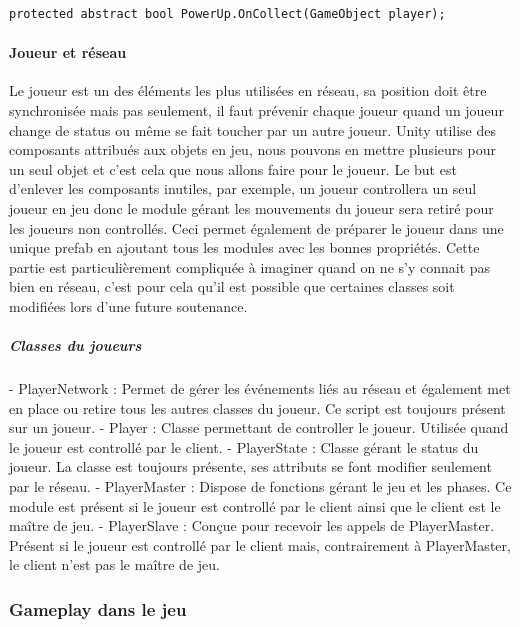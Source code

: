 \documentclass{article}
\begin{document}
\begin{lstlisting}
protected abstract bool PowerUp.OnCollect(GameObject player);
\end{lstlisting}

\paragraph{Joueur et réseau}

Le joueur est un des éléments les plus utilisées en réseau, sa position doit être synchronisée mais pas seulement, il faut prévenir chaque joueur quand un joueur change de status ou même se fait toucher par un autre joueur. Unity utilise des composants attribués aux objets en jeu, nous pouvons en mettre plusieurs pour un seul objet et c'est cela que nous allons faire pour le joueur. Le but est d'enlever les composants inutiles, par exemple, un joueur controllera un seul joueur en jeu donc le module gérant les mouvements du joueur sera retiré pour les joueurs non controllés. Ceci permet également de préparer le joueur dans une unique prefab en ajoutant tous les modules avec les bonnes propriétés.
Cette partie est particulièrement compliquée à imaginer quand on ne s'y connait pas bien en réseau, c'est pour cela qu'il est possible que certaines classes soit modifiées lors d'une future soutenance.

\subparagraph{Classes du joueurs}


- PlayerNetwork : Permet de gérer les événements liés au réseau et également met en place ou retire tous les autres classes du joueur. Ce script est toujours présent sur un joueur.
- Player : Classe permettant de controller le joueur. Utilisée quand le joueur est controllé par le client.
- PlayerState : Classe gérant le status du joueur. La classe est toujours présente, ses attributs se font modifier seulement par le réseau.
- PlayerMaster : Dispose de fonctions gérant le jeu et les phases. Ce module est présent si le joueur est controllé par le client ainsi que le client est le maître de jeu.
- PlayerSlave : Conçue pour recevoir les appels de PlayerMaster. Présent si le joueur est controllé par le client mais, contrairement à PlayerMaster, le client n'est pas le maître de jeu.


\subsubsection{Gameplay dans le jeu}
\end{document}
